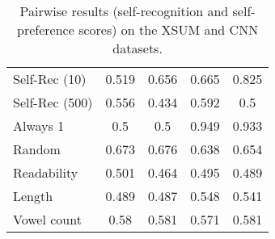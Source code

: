 \begin{table}[h]
\begin{tabular}{l|cccc}
        Self-Rec (10)                      & 0.519       & 0.656       & 0.665       & 0.825       \\
        Self-Rec (500)                     & 0.556       & 0.434       & 0.592       & 0.5         \\
        Always 1                           & 0.5         & 0.5         & 0.949       & 0.933       \\
        Random                             & 0.673       & 0.676       & 0.638       & 0.654       \\
        Readability                        & 0.501       & 0.464       & 0.495       & 0.489       \\
        Length                             & 0.489       & 0.487       & 0.548       & 0.541       \\
        Vowel count                        & 0.58        & 0.581       & 0.571       & 0.581       \\
    \end{tabular}
    \caption{Pairwise results (self-recognition and self-preference scores) on the XSUM and CNN datasets.}
    \label{table:pairwise_results}
\end{table}